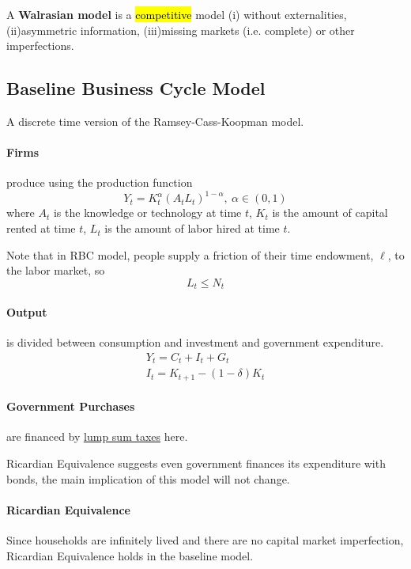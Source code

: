 \documentclass[11pt]{article}
\begin{document}
			\begin{definition}
				A \textbf{Walrasian model} is a \hl{competitive} model (i) without externalities, (ii)asymmetric information, (iii)missing markets (i.e. complete) or other imperfections.
			\end{definition}
		\subsection{Baseline Business Cycle Model}
			\par A discrete time version of the Ramsey-Cass-Koopman model.
			\paragraph{Firms} produce using the production function
			\begin{equation}
				Y_t = K_t^\alpha (A_t L_t)^{1-\alpha},\ \alpha \in (0,1)
			\end{equation}
			where $A_t$ is the knowledge or technology at time $t$, $K_t$ is the amount of capital rented at time $t$, $L_t$ is the amount of labor hired at time $t$.
			\begin{remark}
				Note that in RBC model, people supply a friction of their time endowment, $\ell$, to the labor market, so 
				\[
					L_t \leq N_t
				\]
			\end{remark}
			
			\paragraph{Output} is divided between consumption and investment and government expenditure.
			\begin{gather}
				Y_t = C_t + I_t + G_t \\
				I_t = K_{t+1} - (1-\delta)K_t
			\end{gather}
			
			\paragraph{Government Purchases} are financed by \ul{lump sum taxes} here.
			\begin{remark}
				Ricardian Equivalence suggests even government finances its expenditure with bonds, the main implication of this model will not change.
			\end{remark}
			
			\paragraph{Ricardian Equivalence} Since households are infinitely lived and there are no capital market imperfection, Ricardian Equivalence holds in the baseline model.
			
\end{document}
